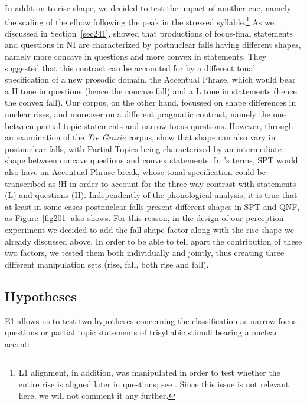 In addition to rise shape, we decided to test the impact of another cue, namely the scaling of the elbow following the peak in the stressed syllable.\footnote{L1 alignment, in addition, was manipulated in order to test whether the entire rise is aligned later in questions; see \citet{dimperio2003tonal}. Since this issue is not relevant here, we will not comment it any further.\label{footnoteL1}} As we discussed in Section~\ref{sec241}, \citet{petrone2008tonal} showed that productions of focus-final statements and questions in NI are characterized by postnuclear falls having different shapes, namely more concave in questions and more convex in statements. They suggested that this contrast can be accounted for by a different tonal specification of a new prosodic domain, the Accentual Phrase, which would bear a H tone in questions (hence the concave fall) and a L tone in statements (hence the convex fall). Our corpus, on the other hand, focussed on shape differences in nuclear rises, and moreover on a different pragmatic contrast, namely the one between partial topic statements and narrow focus questions. However, through an examination of the \textit{Tre Grazie} corpus, \citet{dimperio2011phrasing} show that shape can also vary in postnuclear falls, with Partial Topics being characterized by an intermediate shape between concave questions and convex statements. In \citeauthor{petrone2008tonal}'s \citeyearpar{petrone2008tonal} terms, SPT would also have an Accentual Phrase break, whose tonal specification could be transcribed as !H in order to account for the three way contrast with statements (L) and questions (H). Independently of the phonological analysis, it is true that at least in some cases postnuclear falls present different shapes in SPT and QNF, as Figure~\ref{fig201} also shows. For this reason, in the design of our perception experiment we decided to add the fall shape factor along with the rise shape we already discussed above. In order to be able to tell apart the contribution of these two factors, we tested them both individually and jointly, thus creating three different manipulation sets (rise, fall, both rise and fall).

\subsection{Hypotheses}\label{sec320}
E1 allows us to test two hypotheses concerning the classification as narrow focus questions or partial topic statements of trisyllabic stimuli bearing a nuclear accent:


